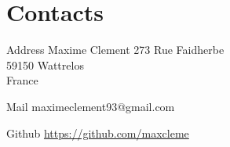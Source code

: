 \documentclass[hidelinks]{cv-style}          %
\begin{document}

\section{Contacts}

\begin{entrylist}
\entry
  {Address}
  {Maxime Clement}
  {}
  {
  273 Rue Faidherbe\\
59150 Wattrelos\\
France\\
}

\entry
  {Mail}
  {maximeclement93@gmail.com}
  {}
  {}
  
\entry
  {Github}
  {\url{https://github.com/maxcleme}}
  {}
  {}
\end{entrylist}
\end{document}
